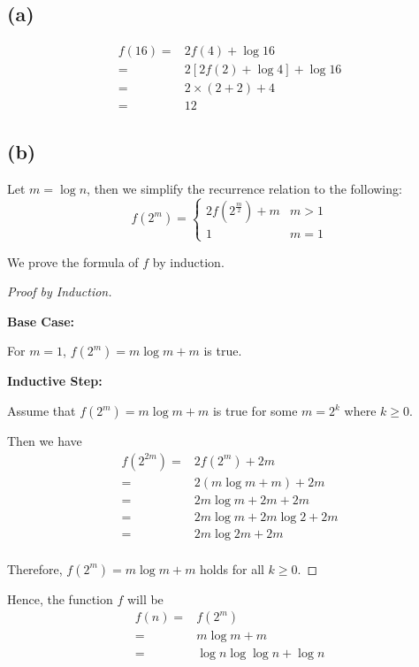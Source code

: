 \documentclass[a4paper,12pt]{article}
\begin{document}
\subsection*{(a)}

\begin{align*}
	f(16) =& 2f(4) + \log 16 \\
	=& 2[2f(2) + \log 4] + \log 16 \\
	=& 2 \times (2 + 2) + 4 \\
	=& 12
\end{align*}

\subsection*{(b)}

Let $m = \log n$, then we simplify the recurrence relation to the following:
\begin{equation*}
	f(2^m) = 
	\begin{cases}
		2f(2^{\frac{m}{2}}) + m & m > 1 \\
		1 & m = 1
	\end{cases}
\end{equation*}

We prove the formula of $f$ by induction.
\begin{proof}[Proof by Induction]
$ $

\textbf{Base Case:}

For $m = 1$, $f(2^m) = m\log m + m$ is true.

\textbf{Inductive Step:}

Assume that $f(2^m) = m\log m + m$ is true for some $m = 2^k$ where $k \geq 0$.

Then we have
\begin{align*}
	f(2^{2m}) =& 2f(2^{m}) + 2m \\
	=& 2(m\log m + m) + 2m \\
	=& 2m\log m + 2m + 2m \\
	=& 2m\log m + 2m\log 2 + 2m \\
	=& 2m\log 2m + 2m \\
\end{align*}

Therefore, $f(2^m) = m\log m + m$ holds for all $k \geq 0$.
\end{proof}

Hence, the function $f$ will be 
\begin{align*}
	f(n) =& f(2^m) \\
	=& m\log m + m \\
	=& \log n \log \log n + \log n
\end{align*}
\end{document}
